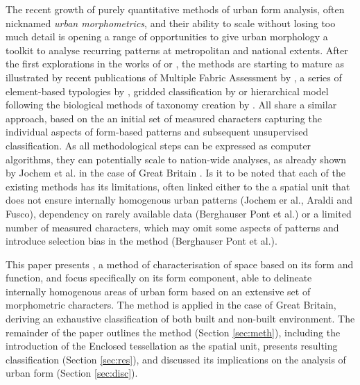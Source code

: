 The recent growth of purely quantitative methods of urban form analysis, often nicknamed
\textit{urban morphometrics}, and their ability to scale without losing too much detail
is opening a range of opportunities to give urban morphology a toolkit to analyse
recurring patterns at metropolitan and national extents. After the first explorations in
the works of \cite{gil2012} or \cite{hamaina2012a}, the methods are starting to mature
as illustrated by recent publications of Multiple Fabric Assessment by
\cite{araldi2019}, a series of element-based typologies by \cite{berghauserpont2019a},
gridded classification by \cite{jochem2020} or hierarchical model following the
biological methods of taxonomy creation by \cite{fleischmann2021a}. All share a similar
approach, based on the an initial set of measured characters capturing the individual
aspects of form-based patterns and subsequent unsupervised classification. As all
methodological steps can be expressed as computer algorithms, they can potentially scale
to nation-wide analyses, as already shown by Jochem et al. in the case of Great Britain
\citep{jochem2021tools}. Is it to be noted that each of the existing methods has its
limitations, often linked either to the a spatial unit that does not ensure internally
homogenous urban patterns (Jochem er al., Araldi and Fusco), dependency on rarely
available data (Berghauser Pont et al.) or a limited number of measured characters,
which may omit some aspects of patterns and introduce selection bias in the method
(Berghauser Pont et al.).

This paper presents , a method of characterisation of space
based on its form and function, and focus specifically on its form component, able to
delineate internally homogenous areas of urban form based on an extensive set of
morphometric characters. The method is applied in the case of Great Britain, deriving an
exhaustive classification of both built and non-built environment. The remainder of the
paper outlines the method (Section \ref{sec:meth}), including the introduction of the
Enclosed tessellation as the spatial unit, presents resulting classification (Section
\ref{sec:res}), and discussed its implications on the analysis of urban form (Section
\ref{sec:disc}).